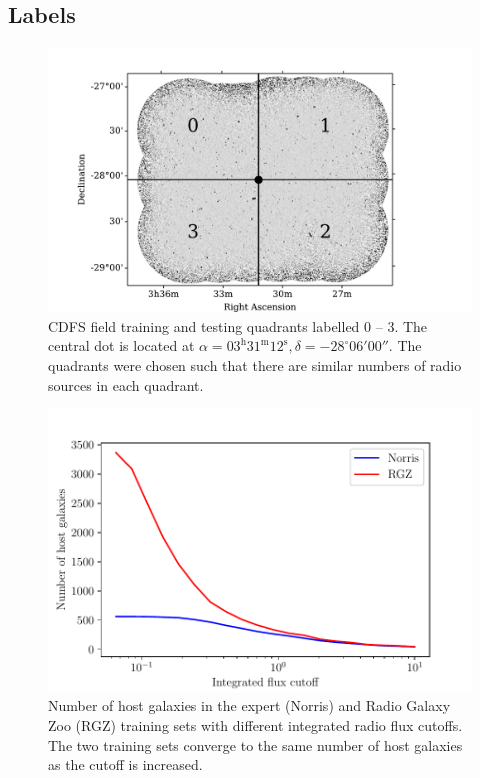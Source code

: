 \documentclass[fleqn,usenatbib,usedcolumn]{mnras}
\begin{document}
  \subsection{Labels}\label{sec:labels}
    \begin{figure}
      \centering
      \includegraphics[width=\columnwidth]{images/quadrants.pdf}
      \caption{CDFS field training and testing quadrants labelled 0 -- 3. The
        central dot is located at $\alpha = 03^\text{h}31^\text{m}12^\text{s},
        \delta = -28^\circ{}06'00''$. The quadrants were chosen such that
        there are similar numbers of radio sources in each
        quadrant.\label{fig:quadrants}}
    \end{figure}

    \begin{figure}
      \centering
      \includegraphics[width=\columnwidth]{images/host_galaxies_flux_cutoff.pdf}
      \caption{Number of host galaxies in the expert (Norris) and Radio Galaxy
        Zoo (RGZ) training sets with different integrated radio flux cutoffs.
        The two training sets converge to the same number of host galaxies as
        the cutoff is increased.}
      \label{fig:distribution-cutoffs}
    \end{figure}
\end{document}
